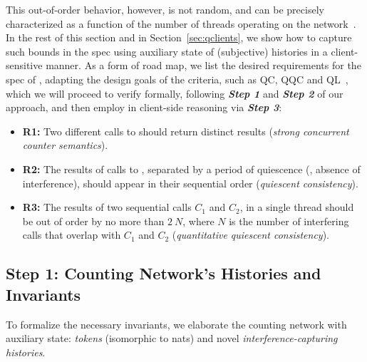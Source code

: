 \noindent

This out-of-order behavior, however, is not random, and can be
precisely characterized as a function of the number of threads
operating on the
network~\cite{Afek-al:OPODIS10,Jagadeesan-Riely:ICALP14}. In the rest
of this section and in Section~\ref{sec:qclients}, we show how to
capture such bounds in the spec using auxiliary state of (subjective)
histories in a client-sensitive manner. As a form of road map, we list
the desired requirements for the spec of ,
%
adapting the design goals of the criteria, such as QC, QQC and
QL~\cite{Aspnes-al:JACM94,Afek-al:OPODIS10,Jagadeesan-Riely:ICALP14},
which we will proceed to verify formally, following \textbf{\emph{Step
    1}} and \textbf{\emph{Step 2}} of our approach, and then employ in
client-side reasoning via \textbf{\emph{Step 3}}:
%
\vspace{2pt}
\begin{itemize}

\item \textbf{R1:} Two different calls to 
  should return distinct results (\emph{strong concurrent
    counter semantics}).

\item \textbf{R2:} The results of calls to ,
  separated by a period of quiescence (\ie, absence of interference),
  should appear in their sequential order (\emph{quiescent
    consistency}).

\item \textbf{R3:} The results of two sequential calls $C_1$ and
  $C_2$, in a single thread should be out of order by no more than $2\
  N$, where $N$ is the number of interfering calls that overlap with
  $C_1$ and $C_2$ (\emph{quantitative quiescent consistency}).

\end{itemize}


\subsection{Step 1: Counting Network's Histories and Invariants}
\label{sec:counting-intuition}

To formalize the necessary invariants, we elaborate the counting
network with auxiliary state: \emph{tokens} (isomorphic to nats) and
novel \emph{interference-capturing histories}.

